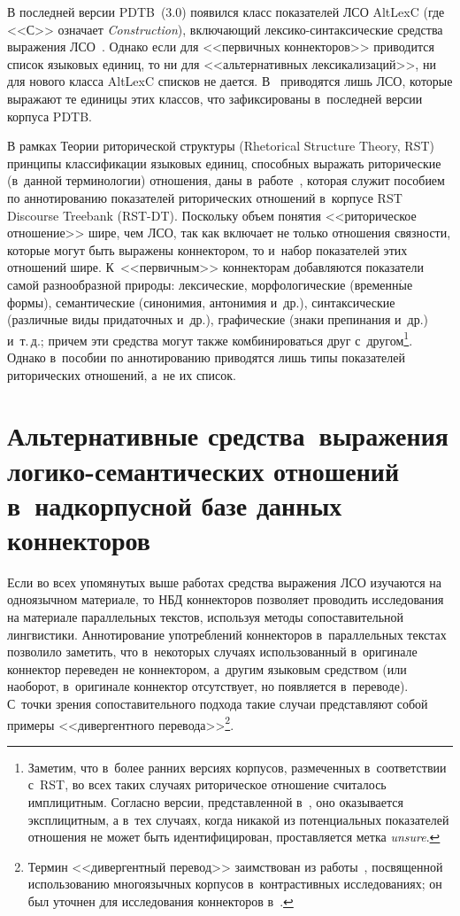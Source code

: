 \begin{multicols}{2}
В последней версии PDTB~(3.0) появился класс показателей ЛСО AltLexC 
(где <<С>> означает \textit{Construction}), включающий лексико-син\-так\-си\-че\-ские 
средства выражения ЛСО~\cite[с.~9--10, 76]{14-in}. Однако 
если для <<первичных коннекторов>> приводится список языковых единиц, 
то ни для <<альтернативных лексикализаций>>, ни для нового класса 
AltLexC списков не дается. В~\cite[с.~75--76]{14-in} приводятся лишь ЛСО, 
которые выражают те единицы этих классов, что зафиксированы в~последней 
версии корпуса PDTB.

В рамках Теории риторической структуры (Rhetorical Structure Theory, RST) 
принципы классификации языковых единиц, способных выражать 
риторические (в~данной терминологии) отношения, даны  
в~работе~\cite[с.~8, 9]{15-in}, которая служит пособием по аннотированию 
показателей риторических отношений в~корпусе RST Discourse Treebank 
(RST-DT). Поскольку объем понятия <<риторическое отношение>> шире, 
чем ЛСО, так как включает не только отношения связности, которые могут 
быть выражены коннектором, то и~набор показателей этих отношений шире. 
К~<<первичным>> коннекторам добавляются показатели самой 
разнообразной природы: лексические, морфологические (временн$\acute{\mbox{ы}}$е формы), 
семантические (синонимия, антонимия и~др.), синтаксические (различные 
виды придаточных и~др.), графические (знаки препинания и~др.) и~т.\,д.; 
причем эти средства могут также комбинироваться друг 
с~другом\footnote[1]{Заметим, что в~более ранних версиях корпусов, размеченных 
в~соответствии с~RST, во всех таких случаях риторическое отношение считалось 
имплицитным. Согласно версии, представленной в~\cite{15-in}, оно оказывается 
эксплицитным, а в~тех случаях, когда никакой из потенциальных показателей отношения 
не может быть идентифицирован, проставляется метка \textit{unsure}.}. Однако 
в~пособии по аннотированию приводятся лишь типы показателей 
риторических отношений, а~не их список.
{

}

\section{Альтернативные средства~выражения логико-семантических отношений в~надкорпусной
базе данных коннекторов}

Если во всех упомянутых выше работах средства выражения ЛСО изучаются 
на одноязычном материале, то НБД коннекторов позволяет проводить 
исследования на материале параллельных текстов, используя методы 
сопоставительной лингвистики. Аннотирование употреблений коннекторов 
в~параллельных текстах позволило заметить, что в~некоторых случаях 
использованный в~оригинале коннектор переведен не коннектором, а~другим 
языковым средством (или наоборот, в~оригинале коннектор отсутствует, но 
появляется в~переводе). С~точки зрения сопоставительного подхода такие 
случаи представляют собой примеры <<дивергентного 
перевода>>\footnote[2]{Термин <<дивергентный перевод>> заимствован из 
работы~\cite{16-in}, посвященной использованию многоязычных корпусов 
в~контрастивных исследованиях; он был уточнен для исследования коннекторов 
в~\cite{17-in}.}.


\end{multicols}
